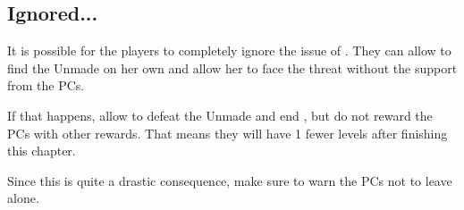 \subsection{Ignored...}
\label{ssec:middnightMotherIgnored}

It is possible for the players to completely ignore the issue of \npcMidnightMother{}. They can allow \npcShallan{} to find the Unmade on her own and allow her to face the threat without the support from the PCs.

If that happens, allow \npcShallan{} to defeat the Unmade and end , but do not reward the PCs with other rewards. That means they will have 1 fewer levels after finishing this chapter.

Since this is quite a drastic consequence, make sure to warn the PCs not to leave \npcShallan{} alone.
